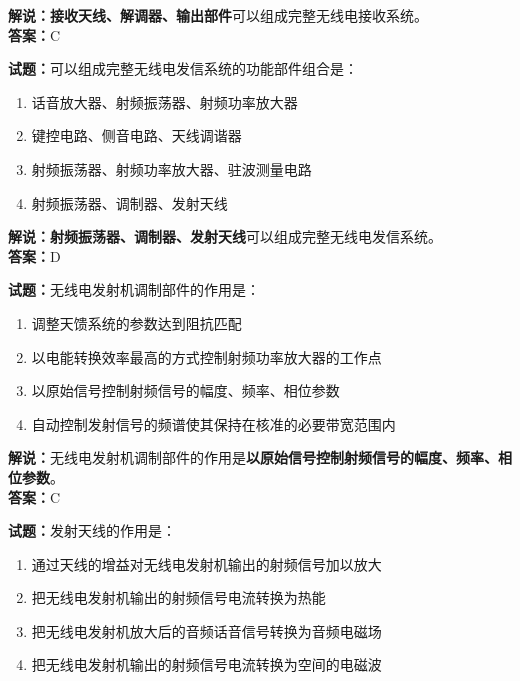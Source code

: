\documentclass{ctexbook}
\begin{document}
\noindent\textbf{解说：}\textbf{接收天线、解调器、输出部件}可以组成完整无线电接收系统。\\\noindent\textbf{答案：}C


\bigskip


\noindent\textbf{试题：}可以组成完整无线电发信系统的功能部件组合是：

\begin{enumerate}[leftmargin=3em]
	\item 话音放大器、射频振荡器、射频功率放大器
	\item 键控电路、侧音电路、天线调谐器
	\item 射频振荡器、射频功率放大器、驻波测量电路
	\item 射频振荡器、调制器、发射天线
\end{enumerate}

\noindent\textbf{解说：}\textbf{射频振荡器、调制器、发射天线}可以组成完整无线电发信系统。\\\noindent\textbf{答案：}D%


\bigskip


\noindent\textbf{试题：}无线电发射机调制部件的作用是：

\begin{enumerate}[leftmargin=3em]
	\item 调整天馈系统的参数达到阻抗匹配
	\item 以电能转换效率最高的方式控制射频功率放大器的工作点
	\item 以原始信号控制射频信号的幅度、频率、相位参数
	\item 自动控制发射信号的频谱使其保持在核准的必要带宽范围内
\end{enumerate}

\noindent\textbf{解说：}无线电发射机调制部件的作用是\textbf{以原始信号控制射频信号的幅度、频率、相位参数}。\\\noindent\textbf{答案：}C%


\bigskip


\noindent\textbf{试题：}发射天线的作用是：

\begin{enumerate}[leftmargin=3em]
	\item 通过天线的增益对无线电发射机输出的射频信号加以放大
	\item 把无线电发射机输出的射频信号电流转换为热能
	\item 把无线电发射机放大后的音频话音信号转换为音频电磁场
	\item 把无线电发射机输出的射频信号电流转换为空间的电磁波
\end{enumerate}
\end{document}
